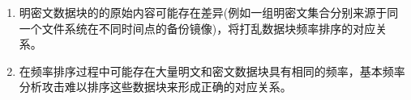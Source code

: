 \begin{enumerate}
    \item 明密文数据块的的原始内容可能存在差异(例如一组明密文集合分别来源于同一个文件系统在不同时间点的备份镜像)，将打乱数据块频率排序的对应关系。
    \item 在频率排序过程中可能存在大量明文和密文数据块具有相同的频率，基本频率分析攻击难以排序这些数据块来形成正确的对应关系。
\end{enumerate}



%
%
%
%
%
%
%
%
%
